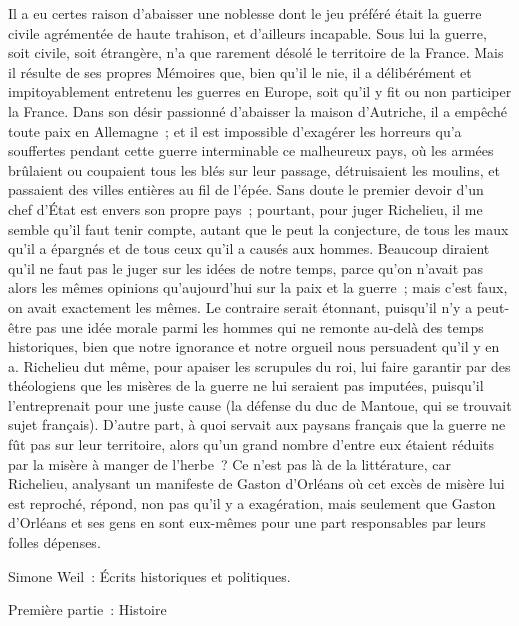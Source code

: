 \documentclass[french,twoside]{book} %
\begin{document}
Il a eu certes raison d'abaisser une noblesse dont le jeu préféré était la guerre civile agrémentée de haute trahison, et d'ailleurs incapable. Sous lui la guerre, soit civile, soit étrangère, n'a que rarement désolé le territoire de la France. Mais il résulte de ses propres Mémoires que, bien qu'il le nie, il a délibérément et impitoyablement entretenu les guerres en Europe, soit qu'il y fit ou non participer la France. Dans son désir passionné d'abaisser la maison d'Autriche, il a empêché toute paix en Allemagne ; et il est impossible d'exa­gérer les horreurs qu'a souffertes pendant cette guerre interminable ce malheureux pays, où les armées brûlaient ou coupaient tous les blés sur leur passage, détruisaient les moulins, et passaient des villes entières au fil de l'épée. Sans doute le premier devoir d'un chef d'État est envers son propre pays ; pourtant, pour juger Richelieu, il me semble qu'il faut tenir compte, autant que le peut la conjecture, de tous les maux qu'il a épargnés et de tous ceux qu'il a causés aux hommes. Beaucoup diraient qu'il ne faut pas le juger sur les idées de notre temps, parce qu'on n'avait pas alors les mêmes opinions qu'aujourd'hui sur la paix et la guerre ; mais c'est faux, on avait exactement les mêmes. Le contraire serait étonnant, puisqu'il n'y a peut-être pas une idée morale parmi les hommes qui ne remonte au-delà des temps historiques, bien que notre ignorance et notre orgueil nous persuadent qu'il y en a. Richelieu dut même, pour apaiser les scrupules du roi, lui faire garantir par des théolo­giens que les misères de la guerre ne lui seraient pas imputées, puisqu'il l'entreprenait pour une juste cause (la défense du duc de Mantoue, qui se trouvait sujet français). D'autre part, à quoi servait aux paysans français que la guerre ne fût pas sur leur territoire, alors qu'un grand nombre d'entre eux étaient réduits par la misère à manger de l'herbe ? Ce n'est pas là de la litté­rature, car Richelieu, analysant un manifeste de Gaston d'Orléans où cet excès de misère lui est reproché, répond, non pas qu'il y a exagération, mais seulement que Gaston d'Orléans et ses gens en sont eux-mêmes pour une part responsables par leurs folles dépenses.\par

\begin{center}
\noindent \centerline{Simone Weil : Écrits historiques et politiques.}\par
\end{center}


\begin{center}
\noindent \centerline{Première partie : Histoire}
\end{center}
\end{document}
